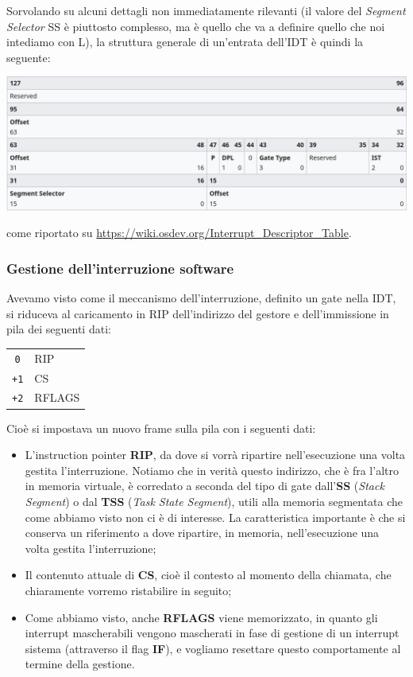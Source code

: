 \documentclass[a4paper,11pt]{article}
\begin{document}
Sorvolando su alcuni dettagli non immediatamente rilevanti (il valore del \textit{Segment Selector} SS è piuttosto complesso, ma è quello che va a definire quello che noi intediamo con L), la struttura generale di un'entrata dell'IDT è quindi la seguente:
\begin{center}
	\includegraphics[scale=0.45]{../figures/entrata_idt.png}
\end{center}
come riportato su \url{https://wiki.osdev.org/Interrupt_Descriptor_Table}.

\subsubsection{Gestione dell'interruzione software}
Avevamo visto come il meccanismo dell'interruzione, definito un gate nella IDT, si riduceva al caricamento in RIP dell'indirizzo del gestore e dell'immissione in pila dei seguenti dati:
\begin{table}[H]
	\center
	\begin{tabular} { c | p{5cm} }
		\lstinline|0| & RIP \\
		\lstinline|+1| & CS \\
		\lstinline|+2| & RFLAGS 
	\end{tabular}
\end{table}
Cioè si impostava un nuovo frame sulla pila con i seguenti dati:
\begin{itemize}
	\item L'instruction pointer \textbf{RIP}, da dove si vorrà ripartire nell'esecuzione una volta gestita l'interruzione.
		Notiamo che in verità questo indirizzo, che è fra l'altro in memoria virtuale, è corredato a seconda del tipo di gate dall'\textbf{SS} (\textit{Stack Segment}) o dal \textbf{TSS} (\textit{Task State Segment}), utili alla memoria segmentata che come abbiamo visto non ci è di interesse. La caratteristica importante è che si conserva un riferimento a dove ripartire, in memoria, nell'esecuzione una volta gestita l'interruzione;
	\item Il contenuto attuale di \textbf{CS}, cioè il contesto al momento della chiamata, che chiaramente vorremo ristabilire in seguito;
	\item Come abbiamo visto, anche \textbf{RFLAGS} viene memorizzato, in quanto gli interrupt mascherabili vengono mascherati in fase di gestione di un interrupt sistema (attraverso il flag \textbf{IF}), e vogliamo resettare questo comportamente al termine della gestione.
\end{itemize}
\end{document}
